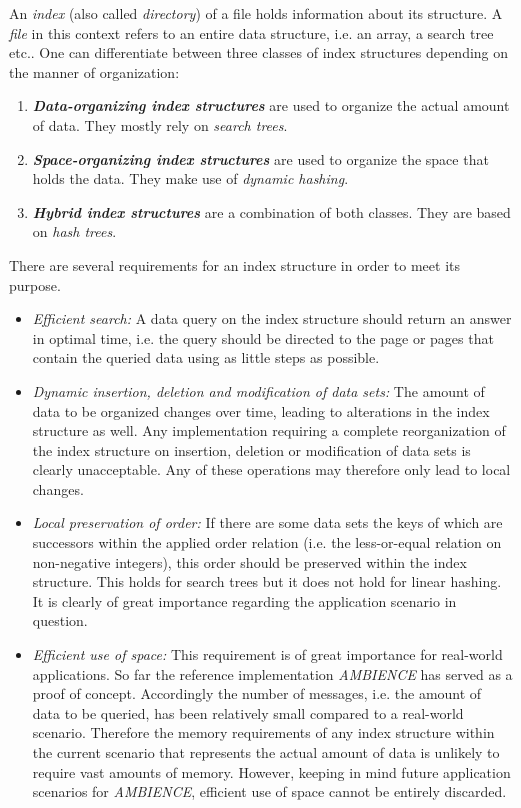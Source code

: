 An \textit{index} (also called \textit{directory}) of a file holds information about its structure. A \textit{file} in this context refers to an entire data structure, i.e. an array, a search tree etc.. One can differentiate between three classes of index structures depending on the manner of organization: 
\begin{enumerate}
	\item \textbf{\textit{Data-organizing index structures}} are used to organize the actual amount of data. They mostly rely on \textit{search trees}. 
	\item \textbf{\textit{Space-organizing index structures}} are used to organize the space that holds the data. They make use of \textit{dynamic hashing}. 
	\item \textbf{\textit{Hybrid index structures}} are a combination of both classes. They are based on \textit{hash trees}.   
\end{enumerate}
There are several requirements for an index structure in order to meet its purpose. 
\begin{itemize}
	\item \textit{Efficient search:} A data query on the index structure should return an answer in optimal time, i.e. the query should be directed to the page or pages that contain the queried data using as little steps as possible.
	\item \textit{Dynamic insertion, deletion and modification of data sets:} The amount of data to be organized changes over time, leading to alterations in the index structure as well. Any implementation requiring a complete reorganization of the index structure on insertion, deletion or modification of data sets is clearly unacceptable. Any of these operations may therefore only lead to local changes. 
	\item \textit{Local preservation of order:} If there are some data sets the keys of which are successors within the applied order relation (i.e. the less-or-equal relation on non-negative integers), this order should be preserved within the index structure. This holds for search trees but it does not hold for linear hashing. It is clearly of great importance regarding the application scenario in question.
	\item \textit{Efficient use of space:} This requirement is of great importance for real-world applications. So far the reference implementation \textit{AMBIENCE} has served as a proof of concept. Accordingly the number of messages, i.e. the amount of data to be queried, has been relatively small compared to a real-world scenario. Therefore the memory requirements of any index structure within the current scenario that represents the actual amount of data is unlikely to require vast amounts of memory. However, keeping in mind future application scenarios for \textit{AMBIENCE}, efficient use of space cannot be entirely discarded. 
\end{itemize}
